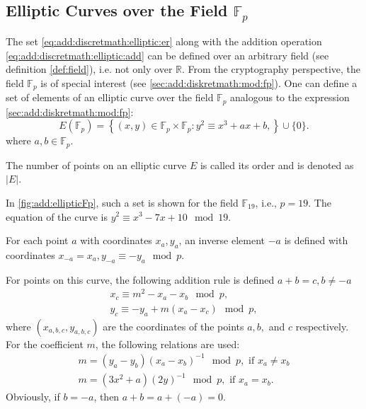 \subsection{Elliptic Curves over the Field $\mathbb{F}_p$}
The set \eqref{eq:add:discretmath:elliptic:er} along with the addition operation \eqref{eq:add:discretmath:elliptic:add} can be defined over an arbitrary field (see definition \ref{def:field}),  i.e. not only over $\mathbb{R}$. From the cryptography perspective, the field $\mathbb{F}_p$ is of special interest (see \autoref{sec:add:diskretmath:mod:fp}). One can define a set of elements of an elliptic curve over the field $\mathbb{F}_p$ analogous to the expression \eqref{sec:add:diskretmath:mod:fp}:
\begin{equation}
E\left(\mathbb{F}_p\right) = \left\{ (x,y) \in \mathbb{F}_p \times \mathbb{F}_p: 
y^2 \equiv x^3 +ax +b, 
\right\} \cup \{0\}.
\label{eq:add:discretmath:elliptic:fp}
\end{equation}
where $a,b \in \mathbb{F}_p$.

\begin{definition}
\label{def:elliptic_curve_order}
The number of points on an elliptic curve $E$ is called its order and is denoted as $\left|E\right|$.
\end{definition}



In \autoref{fig:add:ellipticFp}, such a set is shown for the field $\mathbb{F}_{19}$, i.e., $p = 19$. The equation of the curve is $y^2 \equiv x^3 -7 x + 10 \mod 19$. 

For each point $a$ with coordinates $x_a, y_a$, an inverse element $-a$ is defined with coordinates $x_{-a} = x_a, y_{-a} \equiv -y_a \mod p$.

For points on this curve, the following addition rule is defined $a + b = c, b \ne -a$
\begin{eqnarray}
x_{c} \equiv m^2 - x_a - x_b \mod p,
\nonumber \\
y_{c} \equiv - y_a + m \left(x_a - x_c\right) \mod p,
\label{eq:add:discretmath:elliptic:addfp}
\end{eqnarray}
where $(x_{a,b,c}, y_{a,b,c})$ are the coordinates of the points $a,b,$ and $c$ respectively. For the coefficient $m$, the following relations are used: 
\begin{eqnarray}
m = \left(y_a - y_b\right)\left(x_a - x_b\right)^{-1} \mod p, \mbox{ if } x_a \ne x_b
\nonumber \\
m = \left(3x^2 + a\right)\left(2y\right)^{-1} \mod p, \mbox{ if } x_a = x_b.
\nonumber
\end{eqnarray}
Obviously, if $b = -a$, then $a + b = a + (-a) = 0$.

